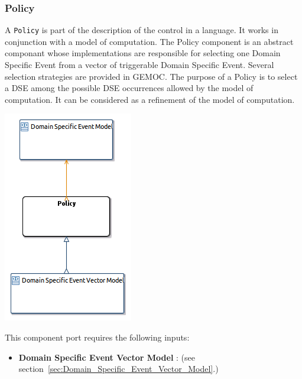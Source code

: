 \documentclass{gemoc} %
\begin{document}
\subsubsection{Policy}
\label{sec:Policy}
A \texttt{Policy} is part of the description of the control in a language. It works in conjunction with a model of computation.
The Policy component is an abstract componant whose implementations are responsible for selecting one Domain Specific Event from a vector of triggerable Domain Specific Event. Several selection strategies are provided in GEMOC.
The purpose of a Policy is to select a DSE among the possible DSE occurrences allowed by the model of computation. It can be considered as a refinement of the model of computation.
\begin{center}
\includegraphics*[trim=0.0cm 0.0cm 0cm 0.0cm, clip=true]{../images/generated/Generated_Policy.png}
\end{center}

This component port requires the following inputs:
\begin{itemize}
  \item \textbf{Domain Specific Event Vector Model} :
(see section~\ref{sec:Domain_Specific_Event_Vector_Model}.)
\end{itemize}
\end{document}
